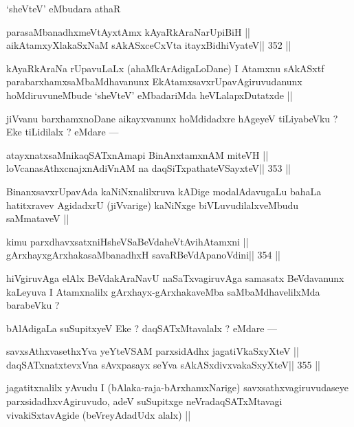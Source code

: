 \begin{artha}
`sheVteV' eMbudara athaR
\end{artha}

\begin{shl}
parasaMbanadhxmeVtAyxtAmx kAyaRkAraNarUpiBiH ||
aikAtamxyXlakaSxNaM sAkASxceCxVta itayxBidhiVyateV\hfill || 352 ||
\end{shl}

\begin{artha}
kAyaRkAraNa rUpavuLaLx (ahaMkArAdigaLoDane) I Atamxnu sAkASxtf parabarxhamxsaMbaMdhavanunx EkAtamxsavxrUpavAgiruvudanunx hoMdiruvuneMbude `sheVteV' eMbadariMda heVLalapxDutatxde ||
\end{artha}

\begin{artha}
jiVvanu barxhamxnoDane aikayxvanunx hoMdidadxre hAgeyeV tiLiyabeVku ? Eke tiLidilalx ? eMdare ---
\end{artha}

\begin{shl}
atayxnatxsaMnikaqSATxnAmapi BinAnxtamxnAM miteVH ||
loVcanasAthxcnajxnAdiVnAM na daqSiTxpathateVSayxteV\hfill || 353 ||
\end{shl}

\begin{artha}
BinanxsavxrUpavAda kaNiNxnalilxruva kADige modalAdavugaLu bahaLa hatitxravev AgidadxrU (jiVvarige) kaNiNxge biVLuvudilalxveMbudu saMmataveV ||
\end{artha}

\begin{shl}
kimu parxdhavxsatxniHsheVSaBeVdaheVtAvihA\s\s tamxni ||
gArxhayxgArxhakasaMbanadhxH savaRBeVdApanoVdini\hfill || 354 ||
\end{shl}

\begin{artha}
hiVgiruvAga elAlx BeVdakAraNavU naSaTxvagiruvAga samasatx BeVdavanunx kaLeyuva I Atamxnalilx gArxhayx-gArxhakaveMba saMbaMdhavelilxMda barabeVku ?
\end{artha}

\begin{artha}
bAlAdigaLa suSupitxyeV Eke ? daqSATxMtavalalx ? eMdare ---
\end{artha}

\begin{shl}
savxsAthxvasethxYva yeYteVSAM parxsidAdhx jagatiVkaSxyXteV ||
daqSATxnatxtevxVna sAvxpasayx seYva sAkASxdivxvakaSxyXteV\hfill || 355 ||
\end{shl}

\begin{artha}
jagatitxnalilx yAvudu I (bAlaka-raja-bArxhamxNarige) savxsathxvagiruvudaseye parxsidadhxvAgiruvudo, adeV suSupitxge neVradaqSATxMtavagi vivakiSxtavAgide (beVreyAdadUdx alalx) ||
\end{artha}

